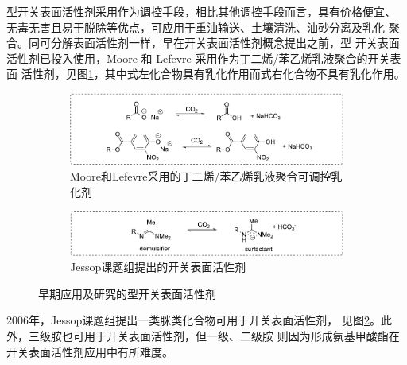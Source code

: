 \documentclass[bachelor,fandolfonts,replaceperiod]{jnuthesis}
\begin{document}
    型开关表面活性剂采用作为调控手段，相比其他调控手段而言，具有价格便宜、
    无毒无害且易于脱除等优点\cite{jessop2012}，可应用于重油输送、土壤清洗、油砂分离及乳化
    聚合\cite{jessop2012}。同可分解表面活性剂一样，早在开关表面活性剂概念提出之前，型
    开关表面活性剂已投入使用，Moore 和 Lefevre 采用作为丁二烯/苯乙烯乳液聚合的开关表面
    活性剂，见图\ref{fig:switchable-co2-a}，其中式左化合物具有乳化作用而式右化合物不具有乳化作用。
    \begin{figure}
    \centering
        \begin{subfigure}[b]{\textwidth}
            \centering
            \includegraphics[width=\textwidth]{Figure/switchable-co2-a.pdf}
            \caption{Moore和Lefevre采用的丁二烯/苯乙烯乳液聚合可调控乳化剂}\label{fig:switchable-co2-a}
        \end{subfigure}%
    
        \begin{subfigure}[b]{\textwidth}
            \centering
            \includegraphics[width=\textwidth]{Figure/switchable-co2-b.pdf}
            \caption{Jessop课题组提出的开关表面活性剂}\label{fig:switchable-co2-b}
        \end{subfigure}%
    \caption{早期应用及研究的型开关表面活性剂}
    \label{fig:switchable-co2}
    \end{figure}
    
    2006年，Jessop课题组\cite{liu2006science}提出一类脒类化合物可用于开关表面活性剂，
    见图\ref{fig:switchable-co2-b}。此外，三级胺也可用于开关表面活性剂，但一级、二级胺
    则因为形成氨基甲酸酯在开关表面活性剂应用中有所难度\cite{jessop2012}。
    
\end{document}
